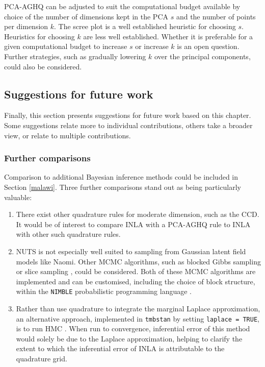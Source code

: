 \documentclass[a4paper, nobind]{templates/ociamthesis}
\providecommand{\tightlist}{%
  \setlength{\itemsep}{0pt}\setlength{\parskip}{0pt}}
\begin{document}
PCA-AGHQ can be adjusted to suit the computational budget available by choice of the number of dimensions kept in the PCA \(s\) and the number of points per dimension \(k\).
The scree plot is a well established heuristic for choosing \(s\).
Heuristics for choosing \(k\) are less well established.
Whether it is preferable for a given computational budget to increase \(s\) or increase \(k\) is an open question.
Further strategies, such as gradually lowering \(k\) over the principal components, could also be considered.

\hypertarget{suggestions-for-future-work}{%
\subsection{Suggestions for future work}\label{suggestions-for-future-work}}

Finally, this section presents suggestions for future work based on this chapter.
Some suggestions relate more to individual contributions, others take a broader view, or relate to multiple contributions.

\hypertarget{further-comparisons}{%
\subsubsection{Further comparisons}\label{further-comparisons}}

Comparison to additional Bayesian inference methods could be included in Section \ref{malawi}.
Three further comparisons stand out as being particularly valuable:

\begin{enumerate}
\def\labelenumi{\arabic{enumi}.}
\tightlist
\item
  There exist other quadrature rules for moderate dimension, such as the CCD.
  It would be of interest to compare INLA with a PCA-AGHQ rule to INLA with other such quadrature rules.
\item
  NUTS is not especially well suited to sampling from Gaussian latent field models like Naomi.
  Other MCMC algorithms, such as blocked Gibbs sampling \autocite{geman1984stochastic} or slice sampling \autocite{neal2003slice}, could be considered.
  Both of these MCMC algorithms are implemented and can be customised, including the choice of block structure, within the \texttt{NIMBLE} probabilistic programming language \autocite{de2017programming}.
\item
  Rather than use quadrature to integrate the marginal Laplace approximation, an alternative approach, implemented in \texttt{tmbstan} by setting \texttt{laplace\ =\ TRUE}, is to run HMC \autocite{monnahan2018no,margossian2020hamiltonian}.
  When run to convergence, inferential error of this method would solely be due to the Laplace approximation, helping to clarify the extent to which the inferential error of INLA is attributable to the quadrature grid.
\end{enumerate}
\end{document}
